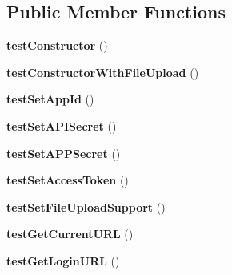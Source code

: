 \subsection*{Public Member Functions}
\begin{DoxyCompactItemize}
\item 
\hypertarget{classPHPSDKTestCase_a656cc5d706129eccae52e6a15d061a7f}{{\bfseries test\-Constructor} ()}\label{classPHPSDKTestCase_a656cc5d706129eccae52e6a15d061a7f}

\item 
\hypertarget{classPHPSDKTestCase_a11f7eae7da8c32df8445bd6d1e06570e}{{\bfseries test\-Constructor\-With\-File\-Upload} ()}\label{classPHPSDKTestCase_a11f7eae7da8c32df8445bd6d1e06570e}

\item 
\hypertarget{classPHPSDKTestCase_a9709f564fcf641a4ae69087b847d68f2}{{\bfseries test\-Set\-App\-Id} ()}\label{classPHPSDKTestCase_a9709f564fcf641a4ae69087b847d68f2}

\item 
\hypertarget{classPHPSDKTestCase_a20cacffff8b7f76acb128f99dbcd2cad}{{\bfseries test\-Set\-A\-P\-I\-Secret} ()}\label{classPHPSDKTestCase_a20cacffff8b7f76acb128f99dbcd2cad}

\item 
\hypertarget{classPHPSDKTestCase_a2939f323e15320c350b72ff4a5744844}{{\bfseries test\-Set\-A\-P\-P\-Secret} ()}\label{classPHPSDKTestCase_a2939f323e15320c350b72ff4a5744844}

\item 
\hypertarget{classPHPSDKTestCase_a95d3630d9ff190641d30bb9da0494cba}{{\bfseries test\-Set\-Access\-Token} ()}\label{classPHPSDKTestCase_a95d3630d9ff190641d30bb9da0494cba}

\item 
\hypertarget{classPHPSDKTestCase_a4076ec699d7241bf3701129051db2a9e}{{\bfseries test\-Set\-File\-Upload\-Support} ()}\label{classPHPSDKTestCase_a4076ec699d7241bf3701129051db2a9e}

\item 
\hypertarget{classPHPSDKTestCase_a87063207f5be4f168e06042bdbaa5755}{{\bfseries test\-Get\-Current\-U\-R\-L} ()}\label{classPHPSDKTestCase_a87063207f5be4f168e06042bdbaa5755}

\item 
\hypertarget{classPHPSDKTestCase_a2b60e4270ac185134fc0337c4b0cccfa}{{\bfseries test\-Get\-Login\-U\-R\-L} ()}\label{classPHPSDKTestCase_a2b60e4270ac185134fc0337c4b0cccfa}


\end{DoxyCompactItemize}

